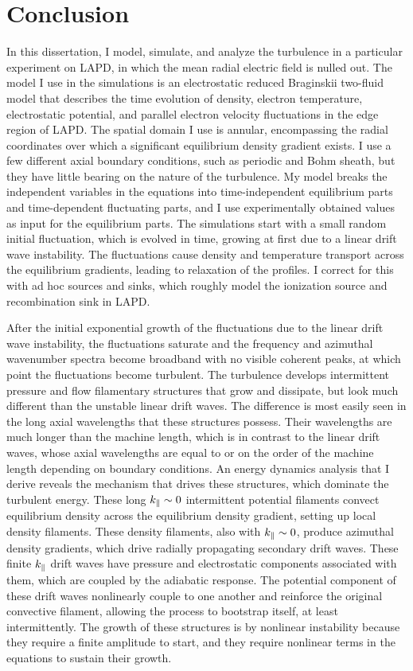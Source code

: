 \chapter{Conclusion}
\label{conclusion}

In this dissertation, I model, simulate, and analyze the turbulence in a particular experiment on LAPD, in which the mean radial electric field is nulled out. 
The model I use in the simulations is an electrostatic reduced Braginskii two-fluid model that describes the time evolution
of density, electron temperature, electrostatic potential, and parallel electron velocity fluctuations in the edge region of LAPD. The spatial domain I use is annular, encompassing the radial coordinates
over which a significant equilibrium density gradient exists. 
I use a few different axial boundary conditions, such as periodic and Bohm sheath, but they have little bearing on the nature of the turbulence.
My model breaks the independent variables in the equations into time-independent equilibrium parts and time-dependent fluctuating parts, and I use experimentally obtained values as input for the
equilibrium parts. The simulations start with a small random initial fluctuation, which is evolved in time, growing at first due to a linear drift wave instability. The fluctuations cause
density and temperature transport across the equilibrium gradients, leading to relaxation of the profiles. I correct for this with ad hoc sources and sinks, which roughly model the ionization
source and recombination sink in LAPD.

After the initial exponential growth of the fluctuations due to the linear drift wave instability, the fluctuations saturate and the frequency and azimuthal wavenumber spectra become broadband
with no visible coherent peaks, at which point the fluctuations become turbulent. The turbulence develops intermittent pressure and flow filamentary structures that grow and dissipate, but look much
different than the unstable linear drift waves. The difference is most easily seen in the long axial wavelengths that these structures possess. Their wavelengths are much longer than
the machine length, which is in contrast to the linear drift waves, whose axial wavelengths are equal to or on the order of the machine length depending on boundary conditions. An energy
dynamics analysis that I derive reveals the mechanism that drives these structures, which dominate the turbulent energy. These long $k_\parallel \sim 0$ intermittent potential 
filaments convect equilibrium density
across the equilibrium density gradient, setting up local density filaments. These density filaments, also with $k_\parallel \sim 0$, produce azimuthal density gradients, which drive radially
propagating secondary drift waves. These finite $k_\parallel$ drift waves have pressure and electrostatic components associated with them, which are coupled by the adiabatic response. The potential
component of these drift waves nonlinearly couple to one another and reinforce the original convective filament, allowing the process to bootstrap itself, at least intermittently. The growth
of these structures is by nonlinear instability because they require a finite amplitude to start, and they require nonlinear terms in the equations to sustain their growth.

